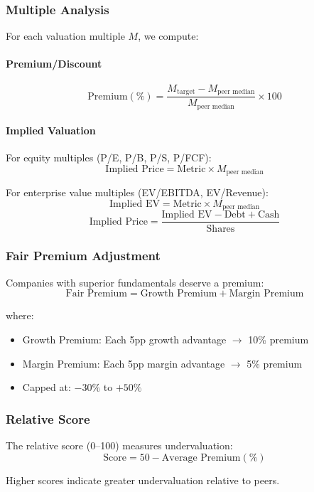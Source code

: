 \subsubsection{Multiple Analysis}

For each valuation multiple $M$, we compute:

\paragraph{Premium/Discount}
\[
\text{Premium}(\%) = \frac{M_{\text{target}} - M_{\text{peer median}}}{M_{\text{peer median}}} \times 100
\]

\paragraph{Implied Valuation}

For equity multiples (P/E, P/B, P/S, P/FCF):
\[
\text{Implied Price} = \text{Metric} \times M_{\text{peer median}}
\]

For enterprise value multiples (EV/EBITDA, EV/Revenue):
\[
\text{Implied EV} = \text{Metric} \times M_{\text{peer median}}
\]
\[
\text{Implied Price} = \frac{\text{Implied EV} - \text{Debt} + \text{Cash}}{\text{Shares}}
\]

\subsubsection{Fair Premium Adjustment}

Companies with superior fundamentals deserve a premium:
\[
\text{Fair Premium} = \text{Growth Premium} + \text{Margin Premium}
\]

where:
\begin{itemize}
  \item[] Growth Premium: Each 5pp growth advantage $\rightarrow$ 10\% premium
  \item[] Margin Premium: Each 5pp margin advantage $\rightarrow$ 5\% premium
  \item[] Capped at: $-30\%$ to $+50\%$
\end{itemize}

\subsubsection{Relative Score}

The relative score (0--100) measures undervaluation:
\[
\text{Score} = 50 - \text{Average Premium}(\%)
\]

Higher scores indicate greater undervaluation relative to peers.

